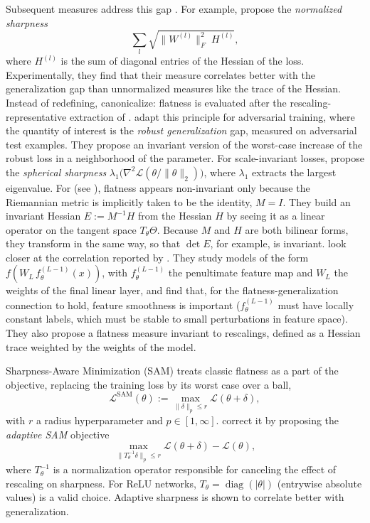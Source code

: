 \documentclass[mathematics,review,submit,moreauthors]{Definitions/mdpi}
\begin{document}
Subsequent measures address this gap \citep{tsuzuku2019,yi2019,petzka2021anips}.
For example, \citet{tsuzuku2019} propose the \emph{normalized sharpness}
\begin{equation*}
    \sum_{l}\sqrt{\lVert W^{(l)}\rVert_F^2\;H^{(l)}},
\end{equation*}
where $H^{(l)}$ is the sum of diagonal entries of the Hessian of the loss.
Experimentally, they find that their measure correlates better with the generalization gap than unnormalized measures like the trace of the Hessian.
Instead of redefining, \citet{pittorino2022jsm} canonicalize: flatness is evaluated after the rescaling-representative extraction of .
\citet{stutz2021} adapt this principle for adversarial training, where the quantity of interest is the \emph{robust generalization} gap, measured on adversarial test examples.
They propose an invariant version of the worst-case increase of the robust loss in a neighborhood of the parameter.
For scale-invariant losses, \citet{lyu2023} propose the \emph{spherical sharpness} $\lambda_1\big(\nabla^2\mathcal{L}(\theta/\lVert\theta\rVert_2)\big)$, where $\lambda_1$ extracts the largest eigenvalue.
For \citet{kristiadi2023anips} (see ), flatness appears non-invariant only because the Riemannian metric is implicitly taken to be the identity, $M=I$.
They build an invariant Hessian $E:=M^{-1}H$ from the Hessian $H$ by seeing it as a linear operator on the tangent space $T_\theta\Theta$.
Because $M$ and $H$ are both bilinear forms, they transform in the same way, so that $\det E$, for example, is invariant.
\citet{petzka2021anips} look closer at the correlation reported by \citet{keskar2017}.
They study models of the form $f(W_L\,f_\theta^{(L-1)}(x))$, with $f_\theta^{(L-1)}$ the penultimate feature map and $W_L$ the weights of the final linear layer, and find that, for the flatness-generalization connection to hold, feature smoothness is important ($f_\theta^{(L-1)}$ must have locally constant labels, which must be stable to small perturbations in feature space).
They also propose a flatness measure invariant to rescalings, defined as a Hessian trace weighted by the weights of the model.

Sharpness-Aware Minimization (SAM) \citep{foret2021} treats classic flatness as a part of the objective, replacing the training loss by its worst case over a ball,
\begin{equation*}
    \mathcal{L}^{\mathrm{SAM}}(\theta):=\max_{\lVert\delta\rVert_p\le r}\mathcal{L}(\theta+\delta),
\end{equation*}
with $r$ a radius hyperparameter and $p\in[1,\infty]$.
\citet{kwon2021p3icml} correct it by proposing the \emph{adaptive SAM} objective
\begin{equation*}
    \max_{\lVert T_\theta^{-1}\delta\rVert_p\le r}\mathcal{L}(\theta+\delta)-\mathcal{L}(\theta),
\end{equation*}
where $T_\theta^{-1}$ is a normalization operator responsible for canceling the effect of rescaling on sharpness.
For ReLU networks, $T_\theta=\operatorname{diag}(|\theta|)$ (entrywise absolute values) is a valid choice.
Adaptive sharpness is shown to correlate better with generalization.
\end{document}
